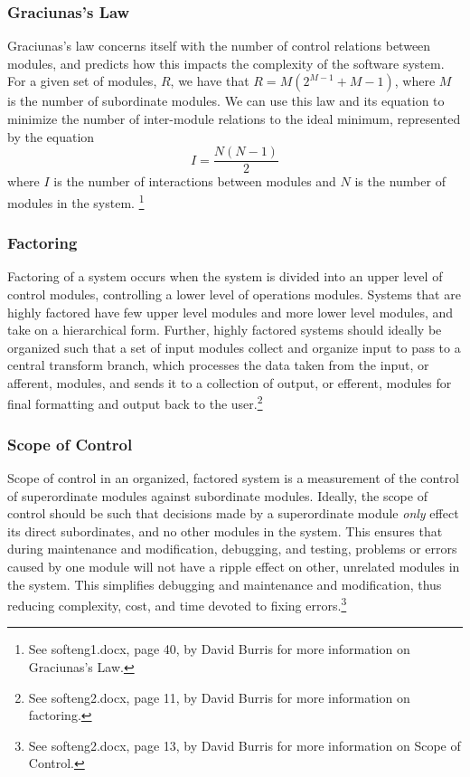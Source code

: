 \documentclass{article}
\begin{document}
		\subsubsection{Graciunas's Law}
			Graciunas's law concerns itself with the number of control relations between modules, and predicts how this impacts the complexity of the software system. For a given set of modules, $R$, we have that $R = M(2^{M-1} + M - 1)$, where $M$ is the number of subordinate modules. We can use this law and its equation to minimize the number of inter-module relations to the ideal minimum, represented by the equation 
			$$I = \frac{N(N - 1)}{2}$$
			where $I$ is the number of interactions between modules and $N$ is the number of modules in the system. \footnote{See softeng1.docx, page 40, by David Burris for more information on Graciunas's Law.}
		\subsubsection{Factoring}
			Factoring of a system occurs when the system is divided into an upper level of control modules, controlling a lower level of operations modules. Systems that are highly factored have few upper level modules and more lower level modules, and take on a hierarchical form. Further, highly factored systems should ideally be organized such that a set of input modules collect and organize input to pass to a central transform branch, which processes the data taken from the input, or afferent, modules, and sends it to a collection of output, or efferent, modules for final formatting and output back to the user.\footnote{See softeng2.docx, page 11, by David Burris for more information on factoring.} 
		\subsubsection{Scope of Control}
			Scope of control in an organized, factored system is a measurement of the control of superordinate modules against subordinate modules. Ideally, the scope of control should be such that decisions made by a superordinate module \emph{only} effect its direct subordinates, and no other modules in the system. This ensures that during maintenance and modification, debugging, and testing, problems or errors caused by one module will not have a ripple effect on other, unrelated modules in the system. This simplifies debugging and maintenance and modification, thus reducing complexity, cost, and time devoted to fixing errors.\footnote{See softeng2.docx, page 13, by David Burris for more information on Scope of Control.}  
\end{document}
